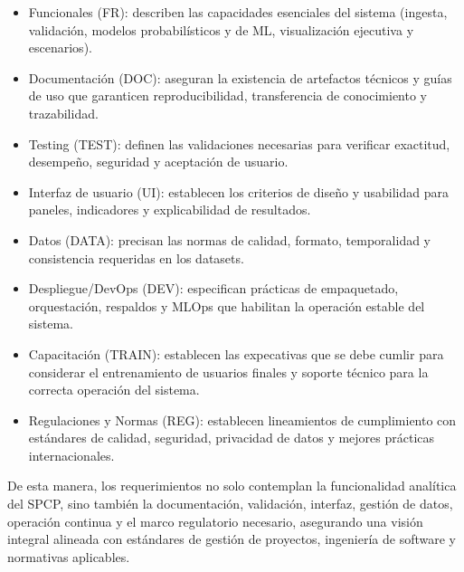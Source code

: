 \documentclass[12pt]
{charter}
\begin{document}
\begin{itemize}
  \item Funcionales (FR): describen las capacidades esenciales del sistema (ingesta, validación, modelos probabilísticos y de ML, visualización ejecutiva y escenarios).
  \item Documentación (DOC): aseguran la existencia de artefactos técnicos y guías de uso que garanticen reproducibilidad, transferencia de conocimiento y trazabilidad.
  \item Testing (TEST): definen las validaciones necesarias para verificar exactitud, desempeño, seguridad y aceptación de usuario.
  \item Interfaz de usuario (UI): establecen los criterios de diseño y usabilidad para paneles, indicadores y explicabilidad de resultados.
  \item Datos (DATA): precisan las normas de calidad, formato, temporalidad y consistencia requeridas en los datasets.
  \item Despliegue/DevOps (DEV): especifican prácticas de empaquetado, orquestación, respaldos y MLOps que habilitan la operación estable del sistema.
  \item Capacitación (TRAIN): establecen las expecativas que se debe cumlir para considerar el entrenamiento de usuarios finales y soporte técnico para la correcta operación del sistema.
  \item Regulaciones y Normas (REG): establecen lineamientos de cumplimiento con estándares de calidad, seguridad, privacidad de datos y mejores prácticas internacionales.
\end{itemize}

De esta manera, los requerimientos no solo contemplan la funcionalidad analítica del SPCP, sino también la documentación, validación, interfaz, gestión de datos, operación continua y el marco regulatorio necesario, asegurando una visión integral alineada con estándares de gestión de proyectos, ingeniería de software y normativas aplicables.
\end{document}
